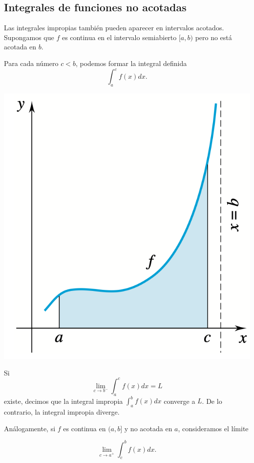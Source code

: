 \subsection{Integrales de funciones no acotadas}

\noindent
\begin{minipage}{.6\textwidth}
Las integrales impropias también pueden aparecer en intervalos acotados. Supongamos que $f$ es continua en el intervalo semiabierto $[a, b)$ pero no está acotada en $b$.


Para cada número $c < b$, podemos formar la integral definida
\[\int_{a}^{c}f(x)dx.\]
\end{minipage}
\begin{minipage}{.39\textwidth}
  \begin{center}
    \includegraphics[width=.9\textwidth]{pics/integral-de-funcion-no-acotada.png}
  \end{center}
\end{minipage}

Si 
\[\lim_{c\rightarrow b^{-}}\int_{a}^{c}f(x)dx=L\]
existe, decimos que la integral impropia $\int_{a}^{b}f(x)dx$ converge a $L$.
De lo contrario, la integral impropia diverge.

Análogamente, si $f$ es continua en $(a, b]$ y no acotada en $a$, consideramos el límite

\[\lim_{c\rightarrow a^{+}}\int_{c}^{b}f(x)dx.\]

